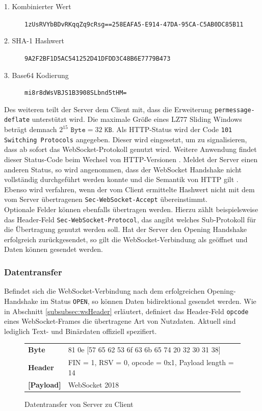 \documentclass[11pt,a4paper,titlepage]{scrartcl}
\numberwithin{equation}{section}
\begin{document}
\begin{description}
	\item[1. Kombinierter Wert] \texttt{1zUsRVYbBDvRKqqZq9cRsg==258EAFA5-E914-47DA-95CA-C5AB0DC85B11}
	\item[2. SHA-1 Hashwert] \texttt{9A2F2BF1D5AC541252D41DFDD3C48B6E7779B473}
	\item[3. Base64 Kodierung] \texttt{mi8r8dWsVBJS1B3908SLbnd5tHM=}
\end{description}

\noindent Des weiteren teilt der Server dem Client mit, dass die Erweiterung \texttt{permessage-deflate} unterstützt wird. Die maximale Größe eines LZ77 Sliding Windows beträgt demnach $ 2^{15} \texttt{ Byte} =  32 \texttt{ KB}$. Als HTTP-Status wird der Code \texttt{101 Switching Protocols} angegeben. Dieser wird eingesetzt, um zu signalisieren, dass ab sofort das WebSocket-Protokoll genutzt wird. Weitere Anwendung findet dieser Status-Code beim Wechsel von HTTP-Versionen \autocite{leach_hypertext_1999}. Meldet der Server einen anderen Status, so wird angenommen, dass der WebSocket Handshake nicht vollständig durchgeführt werden konnte und die Semantik von HTTP gilt \autocite[7]{fette_websocket_2011}. Ebenso wird verfahren, wenn der vom Client ermittelte Hashwert nicht mit dem vom Server übertragenen \texttt{Sec-WebSocket-Accept} übereinstimmt.\\

\noindent Optionale Felder können ebenfalls übertragen werden. Hierzu zählt beispielsweise das Header-Feld \texttt{Sec-WebSocket-Protocol}, das angibt welches Sub-Protokoll für die Übertragung genutzt werden soll. Hat der Server den Opening Handshake erfolgreich zurückgesendet, so gilt die WebSocket-Verbindung als geöffnet und Daten können gesendet werden.

\subsubsection{Datentransfer}\label{subsubsec:wsData}
Befindet sich die WebSocket-Verbindung nach dem erfolgreichen Opening-Handshake im Status \texttt{OPEN}, so können Daten bidirektional gesendet werden. Wie in Abschnitt \ref{subsubsec:wsHeader} erläutert, definiert das Header-Feld \texttt{opcode} eines WebSocket-Frames die übertragene Art von Nutzdaten. Aktuell sind lediglich Text- und Binärdaten offiziell spezifiert. 

\begin{figure}[ht]
	\begin{center}
		\begin{tabular}{ll}
			\textbf{Byte} & 81 0e [57 65 62 53 6f 63 6b 65 74 20 32 30 31 38] \\
			\textbf{Header} & FIN = 1, RSV = 0, opcode = 0x1, Payload length = 14 \\
			 \textbf{[Payload]} & WebSocket 2018 \\
		\end{tabular}
	\vspace{-5mm}
	\end{center}
	\caption{Datentransfer von Server zu Client}
	\label{fig:wsDataTransfer}
\end{figure}
\end{document}
